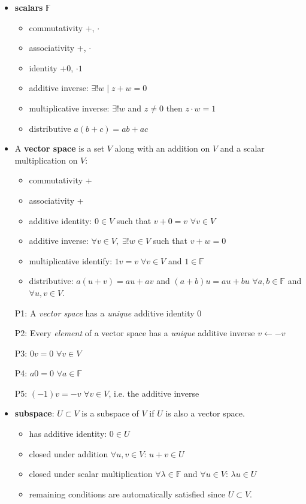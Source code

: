 \documentclass[11pt,notitlepage,oneside]{article}
\begin{document}
\begin{itemize}
\item \textbf{scalars} $\mathbb{F}$
\begin{itemize}
\item commutativity +, $\cdot$
\item associativity +, $\cdot$
\item identity +0, $\cdot 1$
\item additive inverse: $\exists!w \mid z + w = 0$
\item multiplicative inverse: $\exists!w$ and $z\neq0$ then $z\cdot w = 1$ 
\item distributive $a(b+c) = ab+ac$
\end{itemize}
\item A \textbf{vector space} is a set $V$ along with an addition on $V$ and a scalar multiplication on $V$:
\begin{itemize}
\item commutativity +
\item associativity +
\item additive identity: $0\in V$ such that $v+0=v$ $\forall v\in V$
\item additive inverse: $\forall v\in V,\; \exists!w\in V$ such that $v+w=0$
\item multiplicative identify: $1v=v\;\forall v\in V$ and $1\in\mathbb{F}$
\item distributive: $a(u+v)=au+av$ and $(a+b)u=au+bu$ $\forall a,b\in\mathbb{F}$ and $\forall u,v \in V$.
\end{itemize}
 
\item[P1:] A \emph{vector space} has a \emph{unique} additive identity $0$
\item[P2:] Every \emph{element} of a vector space has a \emph{unique} additive inverse $v\leftarrow -v$
\item[P3:] $0v=0$ $\forall v\in V$
\item[P4:] $a0=0$ $\forall a\in \mathbb{F}$
\item[P5:] $(-1)v = -v$ $\forall v\in V$, i.e. the additive inverse

\item \textbf{subspace}: $U\subset V$ is a subspace of $V$ if $U$ is also a vector space.
\begin{itemize}
\item has additive identity: $0\in U$
\item closed under addition $\forall u,v \in V$: $u+v \in U$ 
\item closed under scalar multiplication $\forall \lambda\in \mathbb{F}$ and $\forall u \in V$: $\lambda u \in U$  
\item remaining conditions are automatically satisfied since $U\subset V$.
\end{itemize} 


\end{itemize}
\end{document}
